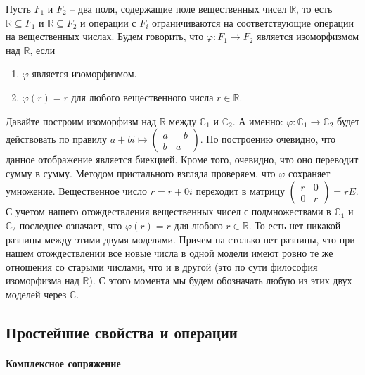 \begin{definition}
Пусть $F_1$ и $F_2$ -- два поля, содержащие поле вещественных чисел $\mathbb R$, то есть $\mathbb R\subseteq F_1$ и $\mathbb R\subseteq F_2$ и операции с $F_i$ ограничиваются на соответствующие операции на вещественных числах.
Будем говорить, что $\varphi\colon F_1\to F_2$ является изоморфизмом над $\mathbb R$, если 
\begin{enumerate}
\item $\varphi$ является изоморфизмом.

\item $\varphi(r) = r$ для любого вещественного числа $r\in \mathbb R$.
\end{enumerate}
\end{definition}

Давайте построим изоморфизм над $\mathbb R$ между $\mathbb C_1$ и $\mathbb C_2$.
А именно: $\varphi\colon \mathbb C_1\to \mathbb C_2$ будет действовать по правилу $a+bi \mapsto \left(\begin{smallmatrix}{a}&{-b}\\{b}&{a}\end{smallmatrix}\right)$.
По построению очевидно, что данное отображение является биекцией.
Кроме того, очевидно, что оно переводит сумму в сумму.
Методом пристального взгляда проверяем, что $\varphi$ сохраняет умножение.
Вещественное число $r = r + 0i$ переходит в матрицу $\left(\begin{smallmatrix}{r}&{0}\\{0}&{r}\end{smallmatrix}\right) = rE$.
С учетом нашего отождествления вещественных чисел с подмножествами в $\mathbb C_1$ и $\mathbb C_2$ последнее означает, что $\varphi(r) = r$ для любого $r\in\mathbb R$.
То есть нет никакой разницы между этими двумя моделями.
Причем на столько нет разницы, что при нашем отождествлении все новые числа в одной модели имеют ровно те же отношения со старыми числами, что и в другой (это по сути философия изоморфизма над $\mathbb R$).
С этого момента мы будем обозначать любую из этих двух моделей через $\mathbb C$.

\subsection{Простейшие свойства и операции}

\paragraph{Комплексное сопряжение}


